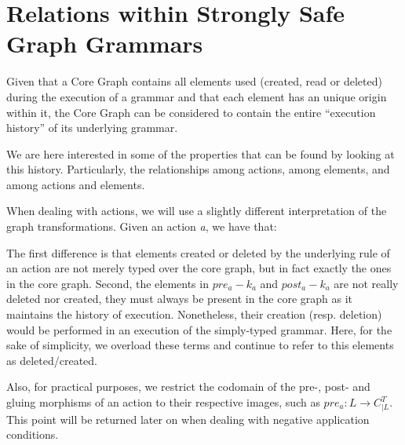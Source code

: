 \begin{example}
\end{example}

\section{Relations within Strongly Safe Graph Grammars}

Given that a Core Graph contains all elements used (created, read or deleted) during the execution of a grammar and that each element has an unique origin within it, the Core Graph can be considered to contain the entire ``execution history'' of its underlying grammar. 

We are here interested in some of the properties that can be found by looking at this history. Particularly, the relationships among actions, among elements, and among actions and elements.

\begin{remark} When dealing with actions, we will use a slightly different interpretation of the graph transformations. Given an action \emph{a}, we have that:
  
\hfill %

The first difference is that elements created or deleted by the underlying rule of an action are not merely typed over the core graph, but in fact exactly the ones in the core graph. Second, the elements in $pre_a - k_a$ and $post_a - k_a$ are not really deleted nor created, they must always be present in the core graph as it maintains the history of execution. Nonetheless, their creation (resp. deletion) would be performed in an execution of the simply-typed grammar. Here, for the sake of
  simplicity, we overload these terms and continue to refer to this elements as deleted/created.

  Also, for practical purposes, we restrict the codomain of the pre-, post- and gluing morphisms of an action to their respective images, such as $pre_a : L \rightarrow C^T_{|L}$. This point will be returned later on when dealing with negative application conditions.
\end{remark}

